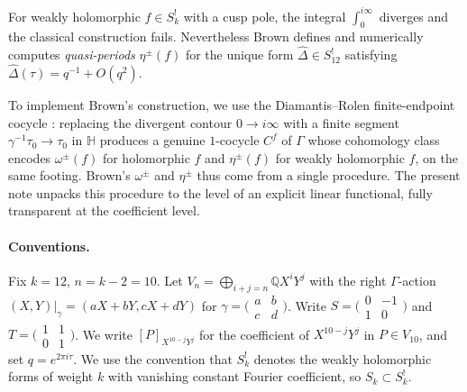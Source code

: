 \documentclass[11pt,letterpaper]{article}
\newcommand{\HH}{\mathbb{H}}
\newcommand{\QQ}{\mathbb{Q}}
\newcommand{\Dhat}{\widehat{\Delta}}
\begin{document}
For weakly holomorphic $f \in S_k^!$ with a cusp pole, the integral
$\int_0^{i\infty}$ diverges and the classical construction fails.
Nevertheless Brown \cite{Brown2017} defines and numerically computes
\emph{quasi-periods} $\eta^\pm(f)$ for the unique form $\Dhat \in S_{12}^!$
satisfying $\Dhat(\tau) = q^{-1} + O(q^2)$. %

To implement Brown's construction, we use the Diamantis--Rolen finite-endpoint cocycle
\cite{DR2017}: replacing the divergent contour $0 \to i\infty$ with a
finite segment $\gamma^{-1}\tau_0 \to \tau_0$ in $\HH$ produces a genuine
$1$-cocycle $C^f$ of $\Gamma$ whose cohomology class encodes
$\omega^\pm(f)$ for holomorphic $f$ and $\eta^\pm(f)$ for weakly
holomorphic $f$, on the same footing.  Brown's $\omega^\pm$ and
$\eta^\pm$ thus come from a single procedure.  The present note unpacks
this procedure to the level of an explicit linear functional, fully
transparent at the coefficient level.

\paragraph{Conventions.}
Fix $k = 12$, $n = k - 2 = 10$.  Let $V_n = \bigoplus_{i+j=n}\QQ X^i Y^j$
with the right $\Gamma$-action $(X,Y)|_\gamma = (aX + bY, cX + dY)$ for
$\gamma = \bigl(\begin{smallmatrix}a&b\\c&d\end{smallmatrix}\bigr)$.
Write $S = \bigl(\begin{smallmatrix}0&-1\\1&0\end{smallmatrix}\bigr)$ and
$T = \bigl(\begin{smallmatrix}1&1\\0&1\end{smallmatrix}\bigr)$.  We
write $[P]_{X^{10-j}Y^j}$ for the coefficient of $X^{10-j}Y^j$ in $P \in V_{10}$,
and set $q = e^{2\pi i \tau}$.  We use the convention that $S_k^!$ denotes
the weakly holomorphic forms of weight $k$ with vanishing constant
Fourier coefficient, so $S_k \subset S_k^!$.
\end{document}
